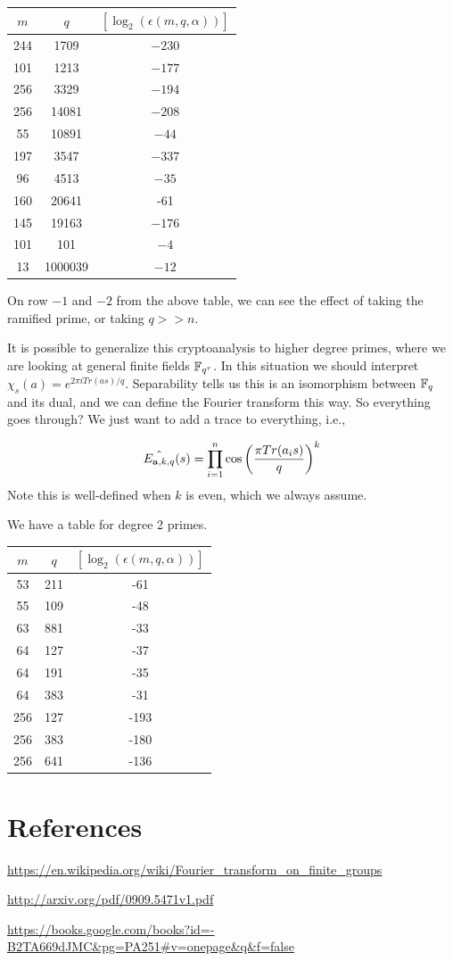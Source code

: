 \documentclass{amsart}
\begin{document}
\FloatBarrier
\begin{table}[H]
\begin{tabular}{c|c|c}
$m$ & $q$ & $[\log_2(\epsilon(m,q, \alpha))]$ \\
\hline
244 & 1709 & $-230$ \\
101 & 1213 & $-177$ \\
256 & 3329 & $-194$ \\
256 & 14081 & $-208$ \\
55 & 10891  & $-44$ \\
197 & 3547 & $-337$ \\
96 & 4513 & $-35$ \\
160 & 20641 & -61 \\
145 & 19163 & $-176$ \\
101 & 101 & $-4$ \\
13 & 1000039 & $-12$
\end{tabular}
\end{table}

On row $-1$ and $-2$ from the above table, we can see the effect of taking the ramified prime, or taking $q >> n$.



\begin{remark}
It is possible to generalize this cryptoanalysis to higher degree primes, where we are looking at general finite fields $\mathbb{F}_{q^r}$. In this situation we should interpret
$\chi_s(a) = e^{2 \pi i Tr(as)/q}$. Separability tells us this is an isomorphism between $\mathbb{F}_q$ and its dual, and we can define the Fourier transform this way. So everything goes through? We just want to add a trace to everything, i.e.,

\[
    \hat{E_{{\bf a}, k, q}}(s) = \prod_{i=1}^{n} \cos \left(\frac{ \pi Tr(a_i s) }{q} \right)^k
\]
Note this is well-defined when $k$ is even, which we always assume.
\end{remark}


We have a table for degree 2 primes.
\FloatBarrier
\begin{table}[H]
\begin{tabular}{c|c|c}
$m$ & $q$ & $[\log_2(\epsilon(m,q, \alpha))]$ \\
\hline
53 & 211 & -61 \\
55 & 109 & -48 \\
63 & 881 & -33 \\
64 & 127 & -37 \\
64 & 191 & -35 \\
64 & 383 & -31 \\
256 & 127 & -193 \\
256 & 383 & -180 \\
256 & 641 & -136 
\end{tabular}
\end{table}



\newpage

\section{References}

\url{https://en.wikipedia.org/wiki/Fourier_transform_on_finite_groups}

\url{http://arxiv.org/pdf/0909.5471v1.pdf}

\url{https://books.google.com/books?id=-B2TA669dJMC&pg=PA251#v=onepage&q&f=false}
\end{document}
